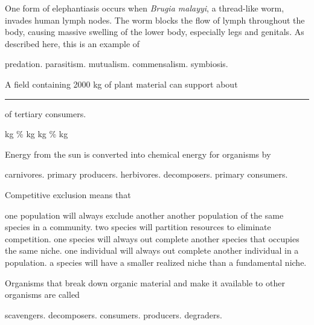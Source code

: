 
\question
One form of elephantiasis occurs when \textit{Brugia malayyi}, a thread-like worm, invades human lymph nodes. The worm blocks the flow of lymph throughout the body, causing massive swelling of the lower body, especially legs and genitals. As described here, this is an example of

\begin{choices}
\choice predation.
\correctchoice parasitism.
\choice mutualism.
\choice commensalism.
\choice symbiosis.
\end{choices}

\newpage

\question
A field containing 2000 kg of plant material can support about \rule{1in}{0.4pt} of tertiary consumers.

\begin{choices}
 kg %
\% %
 kg %
 kg %
\% %
 kg %
\end{choices}

\question
Energy from the sun is converted into chemical energy for organisms by

\begin{choices}
\choice carnivores.
\correctchoice primary producers.
\choice herbivores.
\choice decomposers.
\choice primary consumers.
\end{choices}

\question
Competitive exclusion means that

\begin{choices}
\choice one population will always exclude another another population of the same species in a community. 
\choice two species will partition resources to eliminate competition. 
\correctchoice one species will always out complete another species that occupies the same niche.  
\choice one individual will always out complete another individual in a population. 
\choice a species will have a smaller realized niche than a fundamental niche. 
\end{choices}


\question
Organisms that break down organic material and make it available to other organisms are called

\begin{choices}
\choice scavengers. 
\correctchoice decomposers. 
\choice consumers. 
\choice producers.
\choice degraders.
\end{choices}

